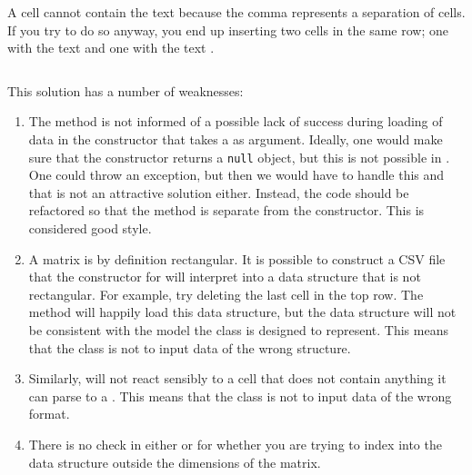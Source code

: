 A cell cannot contain the text  because the comma represents a separation of cells. If you try to do so anyway, you end up inserting two cells in the same row; one with the text  and one with the text .

\inputminted{csharp}{\context/answer/Matrix.cs}

This solution has a number of weaknesses:
\begin{enumerate}
  \item The  method is not informed of a possible lack of success during loading of data in the constructor that takes a  as argument. Ideally, one would make sure that the constructor returns a \texttt{null} object, but this is not possible in \csharp. One could throw an exception, but then we would have to handle this and that is not an attractive solution either. Instead, the code should be refactored so that the  method is separate from the constructor. This is considered good style. %
  \item A matrix is ​​by definition rectangular. It is possible to construct a CSV file that the constructor for  will interpret into a data structure that is not rectangular. For example, try deleting the last cell in the top row. The method  will happily load this data structure, but the data structure will not be consistent with the model the class is designed to represent. This means that the class is not  to input data of the wrong structure.
  \item Similarly,  will not react sensibly to a cell that does not contain anything it can parse to a . This means that the class is not  to input data of the wrong format.
  \item There is no check in either  or  for whether you are trying to index into the data structure outside the dimensions of the matrix.
\end{enumerate}
